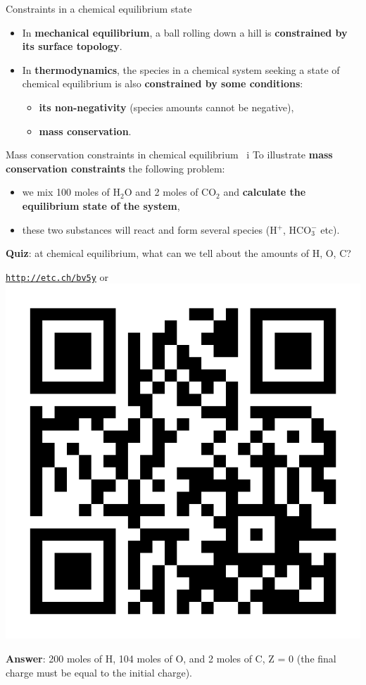 %
%
\begin{frame}{Constraints in a chemical equilibrium state}
\begin{itemize}
\item In \alert{\textbf{mechanical equilibrium}}, a ball rolling down a hill is \textbf{constrained by its surface topology}. 
\pause
\item In \textbf{thermodynamics}, the species in a chemical system seeking a state of chemical
equilibrium is also \textbf{constrained by some conditions}: 
\begin{itemize}
\item \textbf{its non-negativity} (species amounts cannot be negative),
\item \alert{\textbf{mass conservation}}.
\end{itemize}
\end{itemize}
\end{frame}
%
%
%
\begin{frame}{Mass conservation constraints in chemical equilibrium \, i}
%
\vskip 10pt
To illustrate \alert{\textbf{mass conservation constraints}} the following problem: 
\begin{itemize}
\item we mix 100 moles of H$_{2}$O and 2 moles of CO$_{2}$
and \textbf{calculate the equilibrium state of the system}, 
\item these two substances will react and form several species (H$^{+}$,
HCO$_{3}^{-}$ etc).
\end{itemize}
\hiddenpause
\alert{\textbf{Quiz}}: at chemical equilibrium, what can we tell about 
the amounts of H, O, C?

\begin{center}
\href{http://etc.ch/bv5y}{\textcolor{indigo(dye)}{\tt http://etc.ch/bv5y}} 
\quad
or 
\quad
\includegraphics[height=0.21\columnwidth]{figures/chemical-equilibrium/poll.png}
\end{center}

\hiddenpause
\textbf{Answer}: 200 moles of H, 104 moles of O, and 2 moles of C,  Z = 0 (the final charge must be equal to the initial charge). 
\end{frame}
